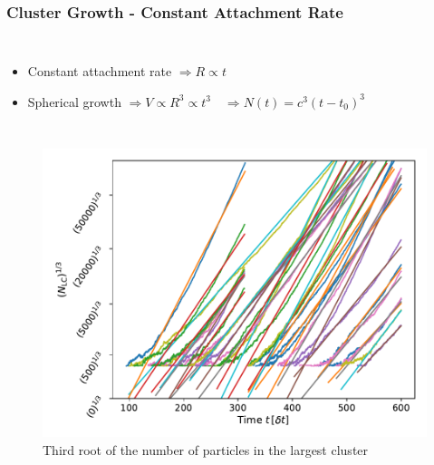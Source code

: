 \documentclass[smaller,notes=hide]{beamer}
\newlength{\wideitemsep}
\let\olditem\item
\renewcommand{\item}{\setlength{\itemsep}{\wideitemsep}\olditem}
\begin{document}
\begin{frame}
\frametitle{Cluster Growth - Constant Attachment Rate}
\begin{columns}
\begin{itemize}
\item Constant attachment rate $\Rightarrow R \propto t$
\item Spherical growth $\Rightarrow V \propto R^3 \propto t^3  \quad \Rightarrow N(t) = c^3 (t-t_0)^3$
\end{itemize}
\end{columns}

\begin{columns}
\begin{figure}[h]
\centering
\includegraphics[width=1 \linewidth]{cluster_growth_example.pdf}
\caption[Largest cluster trajectories from production data with constant attachment rates]{Third root of the number of particles in the largest cluster}
\label{fig:cluster_growth_example}
\end{figure}


\end{columns}
\end{frame}
\end{document}
